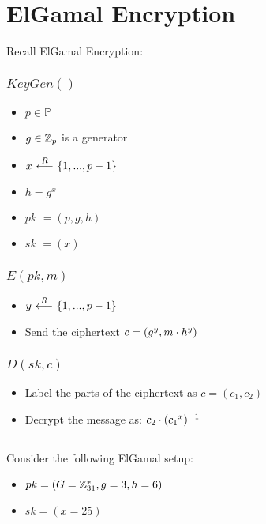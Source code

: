 \documentclass[12pt]{article}
\begin{document}
 


\section{ElGamal Encryption}

Recall ElGamal Encryption:


\subsubsection*{$KeyGen()$}


\begin{itemize}
\item $p \in \mathbb{P}$
\item $g \in \mathbb{Z}_p$ is a generator
\item $x {\ \overset{R}\longleftarrow\ } \{1, ..., p-1\}$
\item $h = g^x$
\item $pk$ $= (p, g, h)$
\item $sk$ $= (x)$
\end{itemize}

\subsubsection*{$E(pk, m)$}


\begin{itemize}
\item $y {\ \overset{R}\longleftarrow\ } \{1, ..., p-1\}$
\item Send the ciphertext $c = (g^y, m \cdot h^y)$
\end{itemize}

\subsubsection*{$D(sk, c)$}


\begin{itemize}
\item Label the parts of the ciphertext as $c = (c_1, c_2)$
\item Decrypt the message as: $c_2 \cdot ({c_1}^x)^{-1}$
\end{itemize}


\subsection{}


Consider the following ElGamal setup:

\begin{itemize}
\item $pk = (G = \mathbb{Z}_{31}^*, g = 3, h = 6)$
\item $sk = (x = 25)$
\end{itemize}
\end{document}
